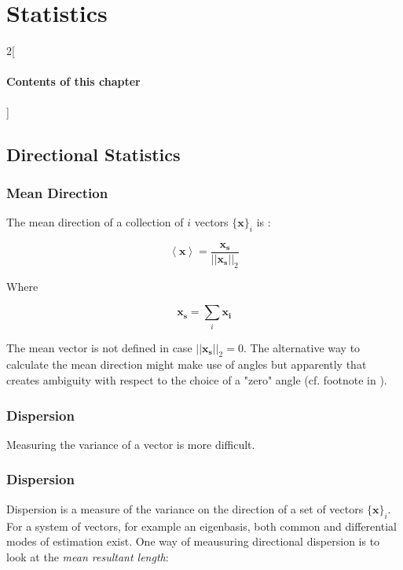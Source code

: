 \chapter{Statistics}
\label{sec:directionalstats}

\begin{multicols}{2}[\subsubsection*{Contents of this chapter}]
\end{multicols}

\section{Directional Statistics}

\subsection{Mean Direction}
The mean direction of a collection of $i$ vectors $\{\mathbf{x}\}_i$ is \cite{damask2019consistent}:

\begin{equation}
\left<\mathbf{x}\right> = \frac{\mathbf{x_s}}{||\mathbf{x_s}||_2}
\end{equation}

Where

\begin{equation}
\mathbf{x_s} = \sum_i \mathbf{x_i}
\end{equation}

The mean vector is not defined in case $||\mathbf{x_s}||_2 = 0$. The alternative way to calculate the mean direction might make use of angles but apparently that creates ambiguity with respect to the choice of a "zero" angle (cf. footnote in \cite{damask2019consistent}).



\subsection{Dispersion}
Measuring the variance of a vector is more difficult. 

\subsection{Dispersion}

Dispersion is a measure of the variance on the direction of a set of vectors $\{\mathbf{x}\}_i$. For a system of vectors, for example an eigenbasis, both common and differential modes of estimation exist. One way of meausuring directional dispersion is to look at the \textit{mean resultant length}:

